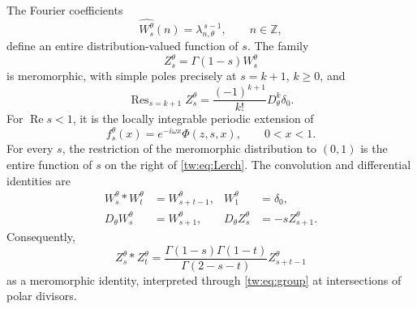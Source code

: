 \begin{theorem}\label{tw:thm:family}
The Fourier coefficients
\begin{equation}\label{tw:eq:W}
 \widehat{W_s^\theta}(n)=\lambda_{n,\theta}^{\,s-1},
 \qquad n\in\mathbb Z,
\end{equation}
define an entire distribution-valued function of $s$. The family
\begin{equation}\label{tw:eq:Z}
 Z_s^\theta=\Gamma(1-s)W_s^\theta
\end{equation}
is meromorphic, with simple poles precisely at $s=k+1$, $k\ge0$, and
\begin{equation}\label{tw:eq:residues}
 \operatorname{Res}_{s=k+1}Z_s^\theta
       =\frac{(-1)^{k+1}}{k!}D_\theta^k\delta_0.
\end{equation}
For $\operatorname{Re}s<1$, it is the locally integrable periodic
extension of
\begin{equation}\label{tw:eq:Lerch}
 f_s^\theta(x)=e^{-i\omega x}\Phi(z,s,x),\qquad 0<x<1.
\end{equation}
For every $s$, the restriction of the meromorphic distribution to
$(0,1)$ is the entire function of $s$ on the right of
\eqref{tw:eq:Lerch}. The convolution and differential identities are
\begin{align}
 W_s^\theta*W_t^\theta&=W_{s+t-1}^\theta,
 &W_1^\theta&=\delta_0,\label{tw:eq:group}\\
 D_\theta W_s^\theta&=W_{s+1}^\theta,
 &D_\theta Z_s^\theta&=-s Z_{s+1}^\theta.\label{tw:eq:derivative}
\end{align}
Consequently,
\begin{equation}\label{tw:eq:Zconv}
 Z_s^\theta*Z_t^\theta
 =\frac{\Gamma(1-s)\Gamma(1-t)}{\Gamma(2-s-t)}
                           Z_{s+t-1}^\theta
\end{equation}
as a meromorphic identity, interpreted through \eqref{tw:eq:group} at
intersections of polar divisors.
\end{theorem}

